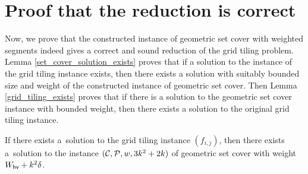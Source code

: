 \section{Proof that the reduction is correct}

Now, we prove that the constructed instance of geometric set cover
with weighted segments indeed gives a correct and sound reduction
of the grid tiling problem. Lemma \ref{set_cover_solution_exists}
proves that if a solution to the instance of the grid tiling instance exists,
then there exists a solution with suitably bounded size and weight
of the constructed instance of geometric set cover.
Then Lemma \ref{grid_tiling_exists} proves that if
there is a solution to the geometric set cover instance with bounded weight,
then there exists a solution to the original grid tiling instance.

\begin{lemma}
\label{set_cover_solution_exists}
	If there exists a~solution to the grid tiling instance $(f_{i,j})$,
	then there exists a~solution to the instance $(\mathcal{C}, \mathcal{P}, w, 3k^2+2k)$
	of geometric set cover with weight $W_{\mathsf{hv}}+k^2\delta$.
\end{lemma}

